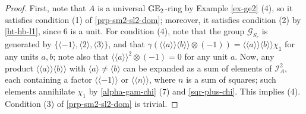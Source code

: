 \documentclass[11pt]{amsart}
\theoremstyle{definition}
\theoremstyle{plain}
\numberwithin{equation}{section}
\newcommand{\GG}{\mathcal{G}}
\newcommand{\II}{\mathcal{I}}
\newcommand{\lan}{\langle}
\newcommand{\ran}{\rangle}
\newcommand{\Lan}{\langle \! \langle}
\newcommand{\Ran}{\rangle \! \rangle}
\newcommand{\GE}{{\rm GE}}
\begin{document}
\begin{proof}
    First, note that $A$ is a universal $\GE_2$-ring by Example \ref{ex-ge2} (4), so it satisfies condition (1) of \ref{prp-sm2-sl2-dom}; moreover, it satisfies condition (2) by \ref{ht-hb-l1}, since $6$ is a unit. For condition (4), note that the group $\GG_{S_r}$ is generated by $\{\lan-1\ran,\lan 2\ran,\lan 3\ran\}$, and that $\gamma(\Lan a\Ran\lan b\Ran\otimes(-1))=\Lan a\Ran\lan b\Ran\chi_1$ for any units $a,b$; note also that $\Lan a\Ran^2\otimes(-1)=0$ for any unit $a$. Now, any product $\Lan a\Ran\lan b\Ran$ with $\lan a\ran\neq\lan b\ran$ can be expanded as a sum of elements of $\II_A^2$, each containing a factor $\Lan-1\Ran$ or $\Lan n\Ran$, where $n$ is a sum of squares; such elements annihilate $\chi_1$ by \ref{alpha-gam-chi} (7) and \ref{sqr-plus-chi}. This implies (4). Condition (3) of \ref{prp-sm2-sl2-dom} is trivial.
\end{proof}
\end{document}
